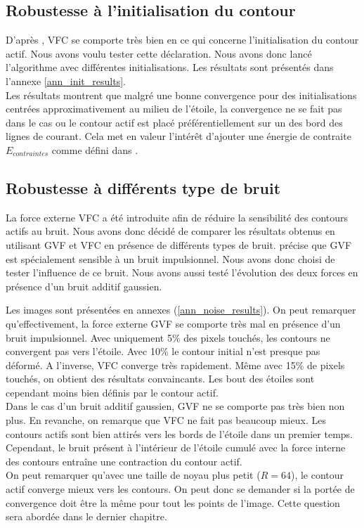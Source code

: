 \subsection{Robustesse à l'initialisation du contour}
D'après \cite{vfc}, VFC se comporte très bien en ce qui concerne l'initialisation du contour actif. Nous avons voulu tester cette déclaration. Nous avons donc lancé l'algorithme avec différentes initialisations. Les résultats sont présentés dans l'annexe \ref{ann_init_results}.\\ 

Les résultats montrent que malgré une bonne convergence pour des initialisations centrées approximativement au milieu de l'étoile, la convergence ne se fait pas dans le cas ou le contour actif est placé préférentiellement sur un des bord des lignes de courant. Cela met en valeur l'intérêt d'ajouter une énergie de contraite $E_{contraintes}$ comme défini dans \cite{kaas}. 


\subsection{Robustesse à différents type de bruit}
La force externe VFC a été introduite afin de réduire la sensibilité des contours actifs au bruit. Nous avons donc décidé de comparer les résultats obtenus en utilisant GVF et VFC en présence de différents types de bruit. \cite{vfc} précise que GVF est spécialement sensible à un bruit impulsionnel. Nous avons donc choisi de tester l'influence de ce bruit. Nous avons aussi testé l'évolution des deux forces en présence d'un bruit additif gaussien. 

Les images sont présentées en annexes (\ref{ann_noise_results}). On peut remarquer qu'effectivement, la force externe GVF se comporte très mal en présence d'un bruit impulsionnel. Avec uniquement 5\% des pixels touchés, les contours ne convergent pas vers l'étoile. Avec 10\% le contour initial n'est presque pas déformé. A l'inverse, VFC converge très rapidement. Même avec 15\% de pixels touchés, on obtient des résultats convaincants. Les bout des étoiles sont cependant moins bien définis par le contour actif.\\

Dans le cas d'un bruit additif gaussien, GVF ne se comporte pas très bien non plus. En revanche, on remarque que VFC ne fait pas beaucoup mieux. Les contours actifs sont bien attirés vers les bords de l'étoile dans un premier temps. Cependant, le bruit présent à l'intérieur de l'étoile cumulé avec la force interne des contours entraîne une contraction du contour actif.\\

On peut remarquer qu'avec une taille de noyau plus petit ($R = 64$), le contour actif converge mieux vers les contours. On peut donc se demander si la portée de convergence doit être la même pour tout les points de l'image. Cette question sera abordée dans le dernier chapitre.
